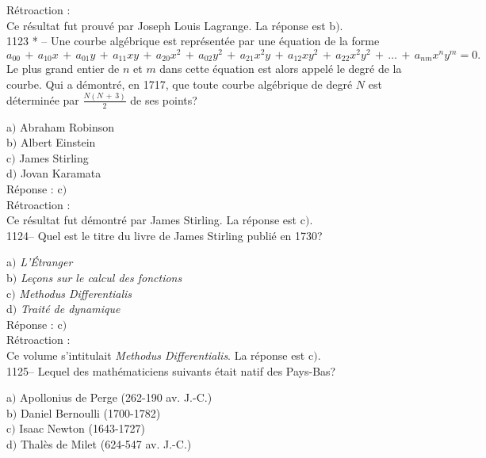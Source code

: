 ﻿\documentclass[letterpaper, 12pt]{article}
\begin{document}
R\'etroaction : \\
Ce r\'esultat fut prouv\'e par Joseph Louis Lagrange.
La r\'eponse est b$)$.\\


1123 * -- Une courbe alg\'ebrique est repr\'esent\'ee par une
\'equation de la forme
$$a_{00}\,+\,a_{10}x\,+\,a_{01}y\,+\,a_{11}xy\,+\,a_{20}x^2\,+\,a_{02}y^2\,+\,a_{21}x^2y\,+\,a_{12}xy^2\,+\,a_{22}x^2y^2\,+\,\ldots\,+\,a_{nm}x^ny^m=0.$$
Le plus grand entier de $n$ et $m$ dans cette \'equation est alors
appel\'e le degr\'e de la courbe. Qui a d\'emontr\'e, en 1717, que
toute courbe alg\'ebrique de degr\'e $N$ est d\'etermin\'ee par
$\frac{N(N\,+\,3)}2$ de ses points?

a$)$ Abraham Robinson \\
b$)$ Albert Einstein \\
c$)$ James Stirling  \\
d$)$ Jovan Karamata\\

R\'eponse : c$)$\\

R\'etroaction : \\
Ce r\'esultat fut d\'emontr\'e par James Stirling.
La r\'eponse est c$)$.\\

1124-- Quel est le titre du livre de James Stirling publi\'e en
1730?

a$)$ {\sl L'\'Etranger} \\
b$)$ {\sl Le\c cons sur le calcul des fonctions}  \\
c$)$ {\sl Methodus Differentialis}  \\
d$)$ {\sl Trait\'e de dynamique} \\

R\'eponse : c$)$\\

R\'etroaction : \\
Ce volume s'intitulait {\sl Methodus Differentialis}.
La r\'eponse est c$)$.\\

1125-- Lequel des math\'ematiciens suivants \'etait natif des
Pays-Bas?

a$)$ Apollonius de Perge (262-190 av. J.-C.) \\
b$)$ Daniel Bernoulli (1700-1782) \\
c$)$ Isaac Newton (1643-1727) \\
d$)$ Thal\`es de Milet (624-547 av. J.-C.)\\
\end{document}
